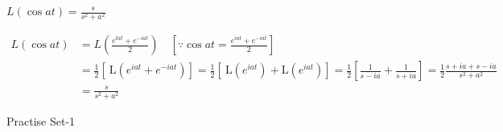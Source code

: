 \begin{exercise}
	$L(\cos a t)=\frac{s}{s^{2}+a^{2}}$
\end{exercise}
\begin{answer}
	\begin{align*}
	L(\cos a t)&=L\left(\frac{e^{t a t}+e^{-i a t}}{2}\right) \quad\left[\because \cos a t=\frac{e^{i a t}+e^{-i a t}}{2}\right]\\
	&=\frac{1}{2}\left[\mathrm{~L}\left(e^{i a t}+e^{-i a t}\right)\right]=\frac{1}{2}\left[\mathrm{~L}\left(e^{i a t}\right)+\mathrm{L}\left(e^{i a t}\right)\right]=\frac{1}{2}\left[\frac{1}{s-i a}+\frac{1}{s+i a}\right]=\frac{1}{2} \frac{s+i a+s-i a}{s^{2}+a^{2}}\\
	&=\frac{s}{s^{2}+a^{2}}
	\end{align*}
\end{answer}
\newpage
\begin{abox}
	Practise Set-1
\end{abox}
